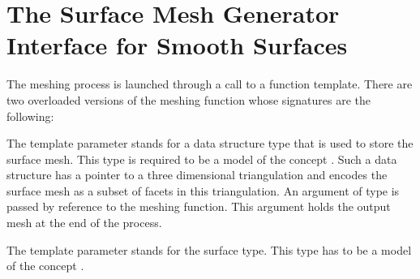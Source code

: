 \section{The Surface Mesh Generator Interface for Smooth Surfaces\label{SurfaceMesher_section_interface}}
\def\ccLongParamLayout{\ccTrue}
The meshing process is launched through a call to a function template.
There are two overloaded versions of the meshing function
whose signatures are the following:






The template parameter 
stands for  a  data structure type  that is used
to store  the surface mesh.  This type is required to be
a model of the concept .
Such a data structure
has a pointer to a three dimensional triangulation and encodes
the surface mesh as a subset of facets in this triangulation.
An argument of type   is passed by reference to the meshing
function. This argument holds the output mesh at the end of the
process.

The template parameter   stands for the surface type.
This type has to be a model of the concept .

